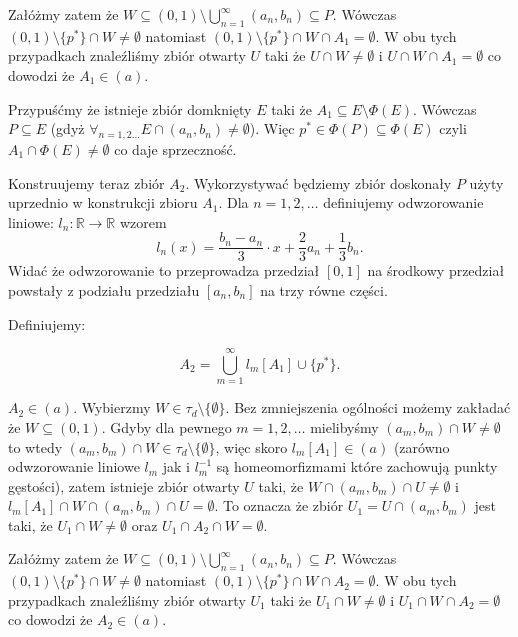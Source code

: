 \documentclass[12pt]{amsart}
\theoremstyle{plain}
\theoremstyle{definition}
\theoremstyle{remark}
\newcommand{\real}{\mathbb{R}}
\newcommand{\aideal}{\mathit{(a)}}
\begin{document}
Załóżmy zatem że $W \subseteq (0,1) \setminus \bigcup_{n=1}^\infty (a_n, b_n) \subseteq P$.
Wówczas $(0,1) \setminus \lbrace p^* \rbrace \cap W \not= \emptyset$
natomiast  $(0,1) \setminus \lbrace p^* \rbrace \cap W \cap A_1 = \emptyset$.
W obu tych przypadkach znaleźliśmy zbiór otwarty $U$ taki że
$U \cap W \not=\emptyset$ i $U \cap W \cap A_1 = \emptyset$
co dowodzi że $A_1 \in \aideal$.

\smallskip

Przypuśćmy że istnieje zbiór domknięty $E$ taki że
$A_1 \subseteq E \setminus \Phi(E)$.
Wówczas $P \subseteq E$ (gdyż $\forall_{n=1,2\ldots} E \cap (a_n, b_n) \not= \emptyset$).
Więc $p^* \in \Phi(P) \subseteq \Phi(E)$ czyli $A_1 \cap \Phi(E) \not= \emptyset$
co daje sprzeczność.

\medskip 

Konstruujemy teraz zbiór $A_2$.
Wykorzystywać będziemy zbiór doskonały $P$
użyty uprzednio w konstrukcji zbioru $A_1$.
Dla $n = 1,2,\ldots$ definiujemy odwzorowanie liniowe:
$l_n\colon \real\to\real$ wzorem
\[l_n(x) = \frac{b_n - a_n}{3} \cdot x + \frac{2}{3} a_n + \frac{1}{3} b_n.\]
Widać że odwzorowanie to przeprowadza przedział $[0,1]$ na
środkowy przedział powstały z podziału przedziału $[a_n, b_n]$ na trzy
równe części.

\smallskip

Definiujemy:

\[ A_2 = \bigcup_{m=1}^{\infty} l_m[A_1] \cup \lbrace p^* \rbrace.
\]


 $A_2 \in \aideal$.
  
Wybierzmy $W \in \tau_d \setminus \lbrace \emptyset \rbrace$.
Bez zmniejszenia ogólności możemy zakładać że 
$W \subseteq (0, 1)$. Gdyby dla pewnego 
$m = 1,2,\ldots$ mielibyśmy $(a_m, b_m) \cap W \not= \emptyset$
to wtedy $(a_m, b_m) \cap W \in \tau_d \setminus \lbrace \emptyset \rbrace$,
więc skoro $l_m[A_1] \in \aideal$ (zarówno odwzorowanie liniowe $l_m$
jak i $l_m^{-1}$ są homeomorfizmami które zachowują punkty gęstości),
zatem istnieje zbiór otwarty $U$ taki, że $W \cap (a_m, b_m) \cap U \not=\emptyset$
i $l_m[A_1] \cap W \cap (a_m, b_m) \cap U = \emptyset$. To oznacza że
zbiór $U_1 = U \cap (a_m, b_m)$ jest taki, że $U_1 \cap W \not=\emptyset$
oraz $U_1 \cap A_2 \cap W = \emptyset$.

Załóżmy zatem że $W \subseteq (0,1) \setminus \bigcup_{n=1}^\infty (a_n, b_n) \subseteq P$.
Wówczas $(0,1) \setminus \lbrace p^* \rbrace \cap W \not= \emptyset$
natomiast  $(0,1) \setminus \lbrace p^* \rbrace \cap W \cap A_2 = \emptyset$.
W obu tych przypadkach znaleźliśmy zbiór otwarty $U_1$ taki że
$U_1 \cap W \not=\emptyset$ i $U_1 \cap W \cap A_2 = \emptyset$
co dowodzi że $A_2 \in \aideal$.
\end{document}
